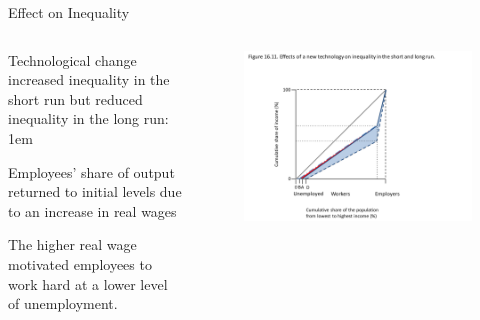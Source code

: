 \documentclass[11pt,aspectratio=43,usenames,dvipsnames]{beamer}
\let\olditemize=\itemize
\let\endolditemize=\enditemize
\renewenvironment{itemize}{\olditemize \itemsep1em}{\endolditemize}
\theoremstyle{definition}
\begin{document}
\begin{frame}{Effect on Inequality}
\label{slide:Effect_on_Inequality}
    \begin{columns}
        \begin{column}{0.4\textwidth}
             Technological change increased inequality in the short run but reduced inequality in the long run:
             \begin{itemize}
                 \item Employees’ share of output returned to initial levels due to an increase in real wages
                 \item The higher real wage motivated employees to work hard at a lower
level of unemployment.
             \end{itemize}
        \end{column}
        \begin{column}{0.6\textwidth}
            \begin{figure}
                \centering
                \includegraphics[width=\textwidth]{./figures/13.pdf}
            \end{figure}

        \end{column}
    \end{columns}

\end{frame}
\end{document}

